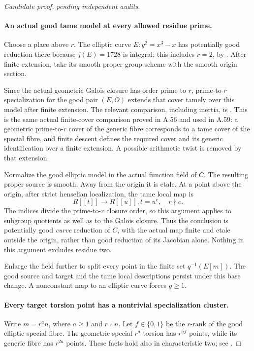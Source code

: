 \begin{proof}[Candidate proof, pending independent audits]
\paragraph{An actual good tame model at every allowed residue prime.}
Choose a place above \(r\). The elliptic curve
\(E:y^2=x^3-x\) has potentially good reduction there
because \(j(E)=1728\) is integral; this includes
\(r=2\), by \cite[Proposition VII.5.5, p.197,
and Appendix A.1.4(b)]{fghSilvermanAEC}.
After finite extension, take its smooth proper group
scheme with the smooth origin section.

Since the actual geometric Galois closure has order
prime to \(r\), prime-to-\(r\) specialization for
the good pair \((E,O)\) extends that cover tamely
over this model after finite extension. The relevant
comparison, including inertia, is
\cite[Expos\'e XIII, Corollary 2.9, Section 2.10 and
the proof of Corollary 2.12]{fghSGA1}. This is the
same actual finite-cover comparison proved in A.56
and used in A.59: a geometric prime-to-\(r\)
cover of the generic fibre corresponds to a tame
cover of the special fibre, and finite descent
defines the required cover and its generic
identification over a finite extension. A possible
arithmetic twist is removed by that extension.

Normalize the good elliptic model in the actual
function field of \(C\). The resulting proper
source is smooth. Away from the origin it is
etale. At a point above the origin, after strict
henselian localization, the tame local map is
\[
                    R[[t]]\longrightarrow R[[u]],
                              t=u^e,\quad r\nmid e.
                                                        \tag{A.64.3}
\]
The indices divide the prime-to-\(r\) closure
order, so this argument applies to subgroup
quotients as well as to the Galois closure.
Thus the conclusion is potentially good
\emph{curve} reduction of \(C\), with the actual
map finite and etale outside the origin, rather
than good reduction of its Jacobian alone.
Nothing in this argument excludes residue two.

Enlarge the field further to split every point
in the finite set \(q^{-1}(E[m])\). The good
source and target and the tame local descriptions
persist under this base change. A nonconstant map
to an elliptic curve forces \(g\ge1\).

\paragraph{Every target torsion point has a nontrivial specialization cluster.}
Write \(m=r^a n\), where \(a\ge1\) and \(r\nmid n\).
Let \(f\in\{0,1\}\) be the \(r\)-rank of the good
elliptic special fibre. The geometric special
\(r^a\)-torsion has \(r^{af}\) points, while its
generic fibre has \(r^{2a}\) points. These facts
hold also in characteristic two; see
\cite[Theorem V.3.1, p.145]{fghSilvermanAEC}.


\end{proof}
